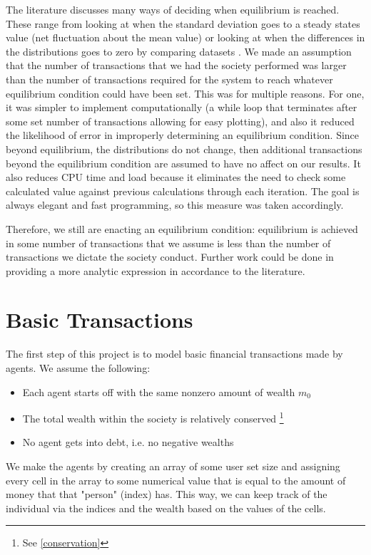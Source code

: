 \documentclass[11pt]{article}
\begin{document}
The literature discusses many ways of deciding when equilibrium is reached. These range from looking at when the standard deviation goes to a steady states value (net fluctuation about the mean value) \cite{patriarca} or looking at when the differences in the distributions goes to zero by comparing datasets \cite{goswami}. We made an assumption that the number of transactions that we had the society performed was larger than the number of transactions required for the system to reach whatever equilibrium condition could have been set. This was for multiple reasons. For one, it was simpler to implement computationally (a while loop that terminates after some set number of transactions allowing for easy plotting), and also it reduced the likelihood of error in improperly determining an equilibrium condition. Since beyond equilibrium, the distributions do not change, then additional transactions beyond the equilibrium condition are assumed to have no affect on our results. It also reduces CPU time and load because it eliminates the need to check some calculated value against previous calculations through each iteration. The goal is always elegant and fast programming, so this measure was taken accordingly. 

Therefore, we still are enacting an equilibrium condition: equilibrium is achieved in some number of transactions that we assume is less than the number of transactions we dictate the society conduct. Further work could be done in providing a more analytic expression in accordance to the literature.

\section{Basic Transactions} \label{basic}

The first step of this project is to model basic financial transactions made by agents. We assume the following:
\begin{itemize}
	\item Each agent starts off with the same nonzero amount of wealth $m_{0}$
	\item The total wealth within the society is relatively conserved \footnote{See \ref{conservation}}
	\item No agent gets into debt, i.e. no negative wealths
\end{itemize}

We make the agents by creating an array of some user set size and assigning every cell in the array to some numerical value that is equal to the amount of money that that "person" (index) has. This way, we can keep track of the individual via the indices and the wealth based on the values of the cells.
\end{document}
